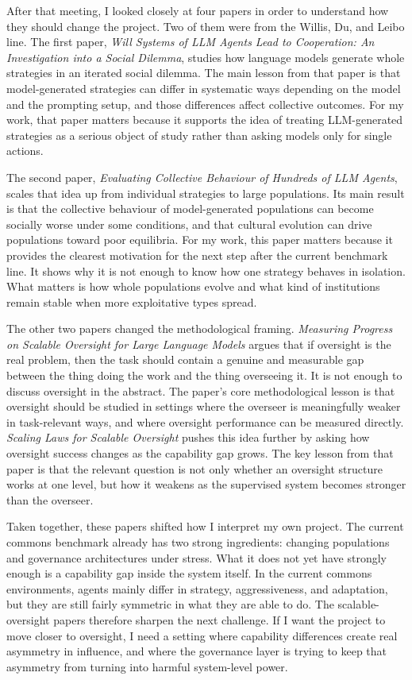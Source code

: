 \documentclass[11pt]{article}
\begin{document}
After that meeting, I looked closely at four papers in order to understand how they should change the project. Two of them were from the Willis, Du, and Leibo line. The first paper, \textit{Will Systems of LLM Agents Lead to Cooperation: An Investigation into a Social Dilemma}, studies how language models generate whole strategies in an iterated social dilemma. The main lesson from that paper is that model-generated strategies can differ in systematic ways depending on the model and the prompting setup, and those differences affect collective outcomes. For my work, that paper matters because it supports the idea of treating LLM-generated strategies as a serious object of study rather than asking models only for single actions.

The second paper, \textit{Evaluating Collective Behaviour of Hundreds of LLM Agents}, scales that idea up from individual strategies to large populations. Its main result is that the collective behaviour of model-generated populations can become socially worse under some conditions, and that cultural evolution can drive populations toward poor equilibria. For my work, this paper matters because it provides the clearest motivation for the next step after the current benchmark line. It shows why it is not enough to know how one strategy behaves in isolation. What matters is how whole populations evolve and what kind of institutions remain stable when more exploitative types spread.

The other two papers changed the methodological framing. \textit{Measuring Progress on Scalable Oversight for Large Language Models} argues that if oversight is the real problem, then the task should contain a genuine and measurable gap between the thing doing the work and the thing overseeing it. It is not enough to discuss oversight in the abstract. The paper's core methodological lesson is that oversight should be studied in settings where the overseer is meaningfully weaker in task-relevant ways, and where oversight performance can be measured directly. \textit{Scaling Laws for Scalable Oversight} pushes this idea further by asking how oversight success changes as the capability gap grows. The key lesson from that paper is that the relevant question is not only whether an oversight structure works at one level, but how it weakens as the supervised system becomes stronger than the overseer.

Taken together, these papers shifted how I interpret my own project. The current commons benchmark already has two strong ingredients: changing populations and governance architectures under stress. What it does not yet have strongly enough is a capability gap inside the system itself. In the current commons environments, agents mainly differ in strategy, aggressiveness, and adaptation, but they are still fairly symmetric in what they are able to do. The scalable-oversight papers therefore sharpen the next challenge. If I want the project to move closer to oversight, I need a setting where capability differences create real asymmetry in influence, and where the governance layer is trying to keep that asymmetry from turning into harmful system-level power.
\end{document}
